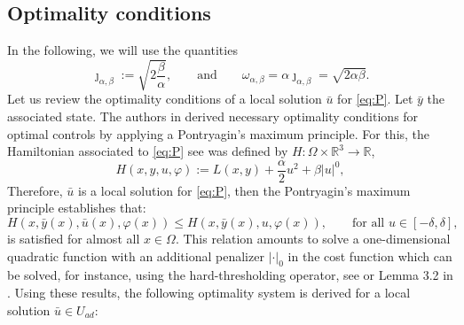 \documentclass[11pt,a4paper]{amsart}
\newcommand{\om}{\Omega}
\begin{document}
\subsection{Optimality conditions} In the following, we will use the quantities
$$ \jmath_{\alpha,\beta} := \sqrt{2\dfrac{\beta}{\alpha}}, \qquad \text{and} \qquad \omega_{\alpha,\beta} =\alpha \jmath_{\alpha,\beta} =\sqrt{2\alpha \beta}.  $$
Let us review the optimality conditions of a local solution $\bar u$ for \eqref{eq:P}. Let $\bar y$ the associated state. The authors in \cite{itokun2014} derived necessary optimality conditions for optimal controls by applying a Pontryagin's maximum principle. For this, the Hamiltonian associated to \eqref{eq:P} see \cite{itokun2014,wachsmuth19,caswach20} was defined by $H:\om\times\mathbb{R}^3\to\mathbb{R}$, 
\[
H(x,y,u,\varphi):=L(x,y)+\frac{\alpha}{2}u^2+\beta|u|^0,
\]
Therefore,  $\bar u$ is a local solution for \eqref{eq:P}, then the Pontryagin's maximum principle establishes that:
\[
H(x,\bar y(x), \bar u(x), \varphi(x))\le H(x,\bar y(x), u, \varphi(x)), \qquad \text{for all }u\in [-\delta,\delta],
\]
is satisfied for almost all $x\in\om$. This relation amounts to solve a one-dimensional quadratic function with an additional penalizer $|\cdot|_0$ in the cost function which can be solved, for instance, using the hard-thresholding operator, see \cite{itokun04} or Lemma 3.2 in \cite{caswach20}. Using these results, the following optimality system is derived for a local solution $\bar u \in U_{ad}$:
\end{document}
